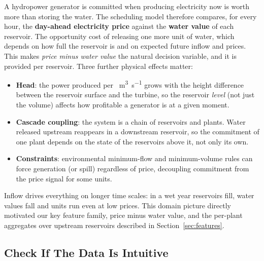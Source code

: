 \documentclass{article}
\begin{document}
A hydropower generator is committed when producing electricity now is
worth more than storing the water. The scheduling model therefore
compares, for every hour, the \textbf{day-ahead electricity price}
against the \textbf{water value} of each reservoir. The opportunity cost
of releasing one more unit of water, which depends on how full the
reservoir is and on expected future inflow and prices. This makes
\emph{price minus water value} the natural decision variable, and it is
provided per reservoir. Three further physical effects matter:
\begin{itemize}
    \item \textbf{Head}: the power produced per
    \SI{}{\cubic\meter\per\second} grows with the height difference
    between the reservoir surface and the turbine, so the reservoir
    \emph{level} (not just the volume) affects how profitable a generator
    is at a given moment.
    \item \textbf{Cascade coupling}: the system is a chain of reservoirs
    and plants. Water released upstream reappears in a downstream
    reservoir, so the commitment of one plant depends on the state of the
    reservoirs above it, not only its own.
    \item \textbf{Constraints}: environmental minimum-flow and
    minimum-volume rules can force generation (or spill) regardless of
    price, decoupling commitment from the price signal for some units.
\end{itemize}
Inflow drives everything on longer time scales: in a wet year reservoirs
fill, water values fall and units run even at low prices. This domain
picture directly motivated our key feature family, price minus water
value, and the per-plant aggregates over upstream reservoirs described in
Section~\ref{sec:features}.

\subsection{Check If The Data Is Intuitive}
\label{sec:intuitive}
\end{document}

